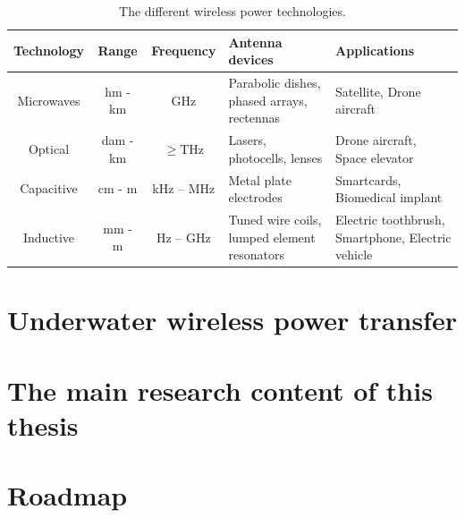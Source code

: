 \makeatletter
\newcommand{\thickhline}{%
\noalign {\ifnum 0=`}\fi \hrule height 1pt
    \futurelet \reserved@a \@xhline
}
\makeatother

\begin{table}[h!]
    \centering
    \begin{tabular}{ |c|c|c|m{3.5cm}<{\centering}|m{3.5cm}<{\centering}| }
        \hline
        \textbf{Technology} & \textbf{Range} & \textbf{Frequency}         & \textbf{Antenna devices}                    & \textbf{Applications}                             \\\hline
Microwaves          & hm - km        & GHz                        & Parabolic dishes, phased arrays, rectennas  & Satellite, Drone aircraft                         \\ \hline
Optical             & dam - km
                    & $\geq$THz      & Lasers, photocells, lenses & Drone aircraft, Space elevator                                                                  \\ \hline
Capacitive          & cm - m         & kHz – MHz                  & Metal plate electrodes                      & Smartcards, Biomedical implant
\\ \hline
Inductive           & mm - m         & Hz – GHz                   & Tuned wire coils, lumped element resonators & Electric toothbrush, Smartphone, Electric vehicle
\\ \hline
    \end{tabular}
    \caption{The different wireless power technologies.}

\end{table}

\section{Underwater wireless power transfer}



\section{The main research content of this thesis}

\section{Roadmap}